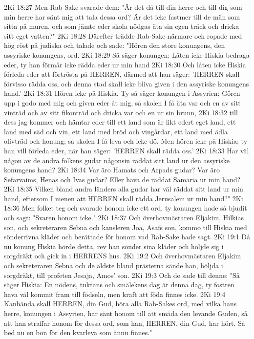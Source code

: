 2Ki 18:27  Men Rab-Sake svarade dem: "Är det då till din herre och till dig som min herre har sänt mig att tala dessa ord? Är det icke fastmer till de män som sitta på muren, och som jämte eder skola nödgas äta sin egen träck och dricka sitt eget vatten?"
2Ki 18:28  Därefter trädde Rab-Sake närmare och ropade med hög röst på judiska och talade och sade: "Hören den store konungens, den assyriske konungens, ord.
2Ki 18:29  Så säger konungen: Låten icke Hiskia bedraga eder, ty han förmår icke rädda eder ur min hand
2Ki 18:30  Och låten icke Hiskia förleda eder att förtrösta på HERREN, därmed att han säger: 'HERREN skall förvisso rädda oss, och denna stad skall icke bliva given i den assyriske konungens hand.'
2Ki 18:31  Hören icke på Hiskia. Ty så säger konungen i Assyrien: Gören upp i godo med mig och given eder åt mig, så skolen I få äta var och en av sitt vinträd och av sitt fikonträd och dricka var och en ur sin brunn,
2Ki 18:32  till dess jag kommer och hämtar eder till ett land som är likt edert eget land, ett land med säd och vin, ett land med bröd och vingårdar, ett land med ädla olivträd och honung; så skolen I få leva och icke dö. Men hören icke på Hiskia; ty han vill förleda eder, när han säger: 'HERREN skall rädda oss.'
2Ki 18:33  Har väl någon av de andra folkens gudar någonsin räddat sitt land ur den assyriske konungens hand?
2Ki 18:34  Var äro Hamats och Arpads gudar? Var äro Sefarvaims, Henas och Ivas gudar? Eller hava de räddat Samaria ur min hand?
2Ki 18:35  Vilken bland andra länders alla gudar har väl räddat sitt land ur min hand, eftersom I menen att HERREN skall rädda Jerusalem ur min hand?"
2Ki 18:36  Men folket teg och svarade honom icke ett ord, ty konungen hade så bjudit och sagt: "Svaren honom icke."
2Ki 18:37  Och överhovmästaren Eljakim, Hilkias son, och sekreteraren Sebna och kansleren Joa, Asafs son, kommo till Hiskia med sönderrivna kläder och berättade för honom vad Rab-Sake hade sagt.
2Ki 19:1  Då nu konung Hiskia hörde detta, rev han sönder sina kläder och höljde sig i sorgdräkt och gick in i HERRENS hus.
2Ki 19:2  Och överhovmästaren Eljakim och sekreteraren Sebna och de äldste bland prästerna sände han, höljda i sorgdräkt, till profeten Jesaja, Amos' son.
2Ki 19:3  Och de sade till denne: "Så säger Hiskia: En nödens, tuktans och smälekens dag är denna dag, ty fostren hava väl kommit fram till födseln, men kraft att föda finnes icke.
2Ki 19:4  Kanhända skall HERREN, din Gud, höra alla Rab-Sakes ord, med vilka hans herre, konungen i Assyrien, har sänt honom till att smäda den levande Guden, så att han straffar honom för dessa ord, som han, HERREN, din Gud, har hört. Så bed nu en bön för den kvarleva som ännu finnes."
